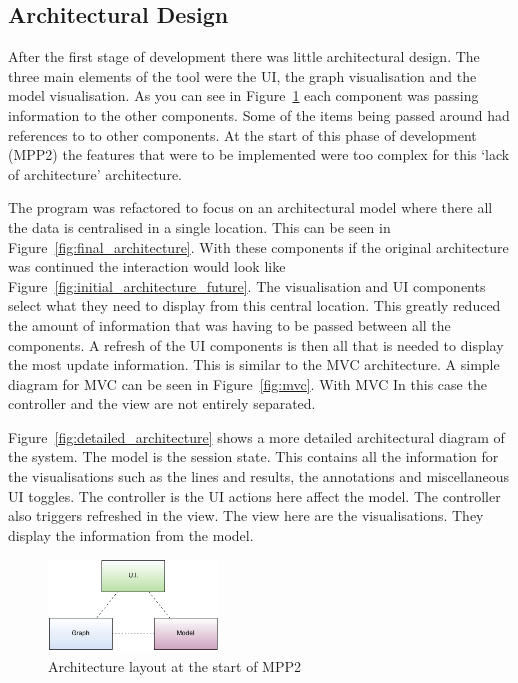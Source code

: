 \subsection{Architectural Design}
\label{sec:architecture}
After the first stage of development there was little architectural design.  The three main elements of the tool were the \ac{UI}, the graph visualisation and the model visualisation.   As you can see in Figure~\ref{fig:initial_architecture} each component was passing information to the other components.  Some of the items being passed around had references to to other components.  At the start of this phase of development (MPP2) the features that were to be implemented were too complex for this `lack of architecture' architecture.

The program was refactored to focus on an architectural model where there all the data is centralised in a single location.  This can be seen in Figure~\ref{fig:final_architecture}.  With these components if the original architecture was continued the interaction would look like Figure~\ref{fig:initial_architecture_future}.  The visualisation and \ac{UI} components select what they need to display from this central location.  This greatly reduced the amount of information that was having to be passed between all the components.  A refresh of the \ac{UI} components is then all that is needed to display the most update information.  This is similar to the \ac{MVC} architecture.  A simple diagram for \ac{MVC} can be seen in Figure~\ref{fig:mvc}.  With \ac{MVC} In this case the controller and the view are not entirely separated.

Figure~\ref{fig:detailed_architecture} shows a more detailed architectural diagram of the system.  The model is the session state.  This contains all the information for the visualisations such as the lines and results, the annotations and miscellaneous \ac{UI} toggles.  The controller is the \ac{UI} actions here affect the model.  The controller also triggers refreshed in the view.  The view here are the visualisations.  They display the information from the model.


\begin{figure}[h!]
    \centering
    \includegraphics[width=0.4\textwidth]{images/initial_architecture.png}
    \caption{Architecture layout at the start of MPP2}
    \label{fig:initial_architecture}
\end{figure}

